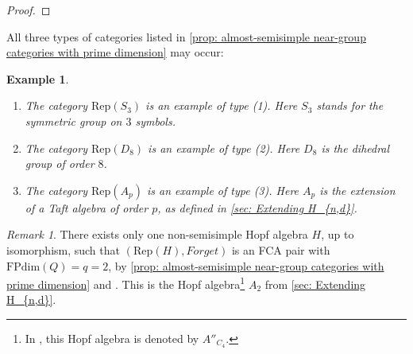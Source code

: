 \documentclass{amsart}
\theoremstyle{plain}%
\newtheorem{example}[lemma]{Example}
\theoremstyle{remark}
\newtheorem{remark}[lemma]{Remark}
\newcommand{\C}{\mathcal{C}}
\newcommand{\1}{\mathbbm{1}}
\newcommand{\D}{\mathcal{D}}
\newcommand{\Z}{\mathbb{Z}}
\newcommand{\FPdim}{\mathrm{FPdim}}
\newcommand{\Rep}{\mathrm{Rep}}
\newcommand{\kk}{\mathbbm{k}}
\begin{document}
\begin{proof}

    \end{proof}  
    All three types of categories listed in \cref{prop: almost-semisimple near-group categories with prime dimension} may occur:
    \begin{example}
    \mbox{}
        \begin{enumerate}
            \item The category $\Rep(S_3)$ is an example of type (1). Here $S_3$ stands for the symmetric group on $3$ symbols.
            \item The category $\Rep(D_8)$ is an example of type (2). Here $D_8$ is the dihedral group of order $8$. 
            \item The category $\Rep(A_p)$ is an example of type (3). Here $A_p$ is the extension of a Taft algebra of order $p$, as defined in \cref{sec: Extending H_{n,d}}.
        \end{enumerate}
    \end{example}
   

\begin{remark}
    There exists only one non-semisimple Hopf algebra $H$, up to isomorphism, such that $(\Rep(H), Forget)$ is an FCA pair with $\FPdim(Q) =q = 2$, by \cref{prop: almost-semisimple near-group categories with prime dimension} and \cite{Ste}. This is the Hopf algebra\footnote{In \cite{Ste}, this Hopf algebra is denoted by $A''_{C_4}$.} $A_2$ from \cref{sec: Extending H_{n,d}}.
\end{remark}
\printbibliography
\end{document}
